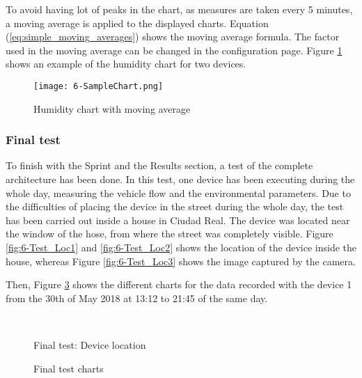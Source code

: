 To avoid having lot of peaks in the chart, as measures are taken every 5 minutes, a moving average is applied to the displayed charts. Equation (\ref{eq:simple_moving_averages}) shows the moving average formula. The factor used in the moving average can be changed in the configuration page. Figure \ref{fig:6-SampleChart} shows an example of the humidity chart for two devices.

\begin{figure}[!h]
	\begin{center}
		\texttt{[image: 6-SampleChart.png]}
		\caption{Humidity chart with moving average}
		\label{fig:6-SampleChart}
	\end{center}
\end{figure}


\subsubsection{Final test}
To finish with the Sprint and the Results section, a test of the complete architecture has been done. In this test, one device has been executing during the whole day, measuring the vehicle flow and the environmental parameters. Due to the difficulties of placing the device in the street during the whole day, the test has been carried out inside a house in Ciudad Real. The device was located near the window of the hose, from where the street was completely visible. Figure \ref{fig:6-Test_Loc1} and \ref{fig:6-Test_Loc2} shows the location of the device inside the house, whereas Figure \ref{fig:6-Test_Loc3} shows the image captured by the camera. 

Then, Figure \ref{fig:6-RealTime} shows the different charts for the data recorded with the device 1 from the 30th of May 2018 at 13:12 to 21:45 of the same day.

\begin{figure}[htb]
	\centering
	\\
	\caption{Final test: Device location}
	\label{fig:6-Test_Loc}
\end{figure}

\begin{figure}[htb]
	\centering
	\caption{Final test charts}
	\label{fig:6-RealTime}
\end{figure}

